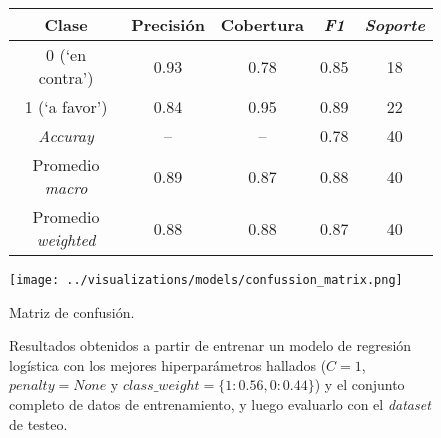 \begin{figure}
    \begin{minipage}[b]{.6\linewidth}
    \centering
        \begin{adjustbox}{max width=\textwidth}
        \begin{tabular}{ *{5}{|c}| }
        \hline
        Clase & Precisi\'on & Cobertura & \textit{F1} & \textit{Soporte} \\
        \hline{} (`en contra') & 0.93 & 0.78 & 0.85 & 18 \\
         (`a favor') & 0.84 & 0.95 & 0.89  & 22 \\
        \hline\hline
        \textit{Accuray} & {--} & {--} & 0.78 & 40 \\
        \hline
        Promedio \textit{macro} & 0.89 & 0.87 & 0.88 & 40 \\
        \hline
        Promedio \textit{weighted} & 0.88 & 0.88 & 0.87 & 40 \\
        \hline
        \end{tabular}
        \end{adjustbox}
        \label{table-results-models-held-out}
    \end{minipage}\hfill
    \begin{minipage}[t]{.35\linewidth}
      \centering
        \texttt{[image: ../visualizations/models/confussion\_matrix.png]}
        \caption{Matriz de confusi\'on.}
        \label{fig-results-models-held-out}
    \end{minipage}
    \caption*{Resultados obtenidos a partir de entrenar un modelo de
    regresi\'on log\'istica con los mejores hiperpar\'ametros hallados
    ($C=1$, $penalty=None$ y $class\_weight=\lbrace1:0.56,0:0.44\rbrace$)
    y el conjunto completo de datos de entrenamiento,
    y luego evaluarlo con el \textit{dataset} de testeo.}
  \end{figure}

